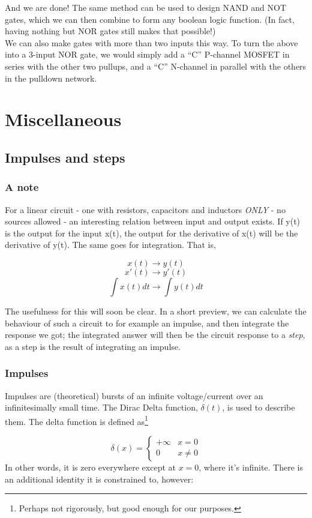 \documentclass[12pt,a4paper]{report}
\begin{document}
And we are done! The same method can be used to design NAND and NOT gates, which we can then combine to form any boolean logic function. (In fact, having nothing but NOR gates still makes that possible!)\\

We can also make gates with more than two inputs this way. To turn the above into a 3-input NOR gate, we would simply add a ``C'' P-channel MOSFET in series with the other two pullups, and a ``C'' N-channel in parallel with the others in the pulldown network.



\chapter{Miscellaneous}
\section{Impulses and steps}

\subsection{A note}
For a linear circuit - one with resistors, capacitors and inductors \emph{ONLY} - no sources allowed - an interesting relation between input and output exists. If y(t) is the output for the input x(t), the output for the derivative of x(t) will be the derivative of y(t). The same goes for integration. That is,

\[ x(t) \to y(t) \]
\[ x'(t) \to y'(t) \]
\[ \int x(t) dt \to \int y(t) dt \]

The usefulness for this will soon be clear. In a short preview, we can calculate the behaviour of such a circuit to for example an impulse, and then integrate the response we got; the integrated answer will then be the circuit response to a \emph{step}, as a step is the result of integrating an impulse.

\subsection{Impulses}
Impulses are (theoretical) bursts of an infinite voltage/current over an infinitesimally small time. The Dirac Delta function, $\delta(t)$, is used to describe them. The delta function is defined as\footnote{Perhaps not rigorously, but good enough for our purposes.}

\[ \delta(x) = \begin{cases}
   +\infty & x = 0 \\
   0       & x \neq 0
   \end{cases}
\]
In other words, it is zero everywhere except at $x = 0$, where it's infinite. There is an additional identity it is constrained to, however:
\end{document}
